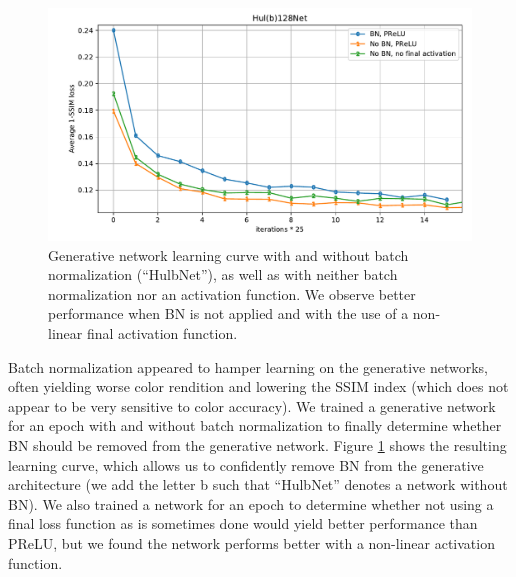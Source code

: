 \begin{figure}[!htbp]
\centering
\includegraphics[width=1\linewidth]{gfx/graphs/gen-BN.pdf}
\caption[Generative network learning curve with and without batch normalization]{Generative network learning curve with and without batch normalization (``HulbNet''), as well as with neither batch normalization nor an activation function. We observe better performance when \acl{BN} is not applied and with the use of a non-linear final activation function.}
\label{fig:gen-BN}
\end{figure}

Batch normalization appeared to hamper learning on the generative networks, often yielding worse color rendition and lowering the \ac{SSIM} index (which does not appear to be very sensitive to color accuracy). We trained a generative network for an epoch with and without batch normalization to finally determine whether \ac{BN} should be removed from the generative network. Figure \ref{fig:gen-BN} shows the resulting learning curve, which allows us to confidently remove \ac{BN} from the generative architecture (we add the letter b such that ``HulbNet'' denotes a network without \ac{BN}). We also trained a network for an epoch to determine whether not using a final loss function as is sometimes done \cite{dncnn} would yield better performance than \ac{PReLU}, but we found the network performs better with a non-linear activation function.



